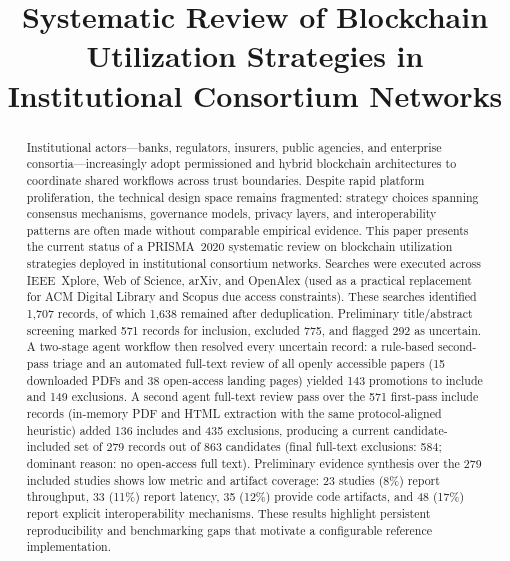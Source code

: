 \documentclass[journal]{IEEEtran}
\begin{document}
\title{Systematic Review of Blockchain Utilization Strategies in Institutional Consortium Networks}

\author{
}

\maketitle

\begin{abstract}
Institutional actors---banks, regulators, insurers, public agencies, and enterprise consortia---increasingly adopt permissioned and hybrid blockchain architectures to coordinate shared workflows across trust boundaries.
Despite rapid platform proliferation, the technical design space remains fragmented: strategy choices spanning consensus mechanisms, governance models, privacy layers, and interoperability patterns are often made without comparable empirical evidence.
This paper presents the current status of a PRISMA~2020 systematic review on blockchain utilization strategies deployed in institutional consortium networks.
Searches were executed across IEEE~Xplore, Web of Science, arXiv, and OpenAlex (used as a practical replacement for ACM Digital Library and Scopus due access constraints).
These searches identified 1,707 records, of which 1,638 remained after deduplication.
Preliminary title/abstract screening marked 571 records for inclusion, excluded 775, and flagged 292 as uncertain.
A two-stage agent workflow then resolved every uncertain record: a rule-based second-pass triage and an automated full-text review of all openly accessible papers (15 downloaded PDFs and 38 open-access landing pages) yielded 143 promotions to include and 149 exclusions.
A second agent full-text review pass over the 571 first-pass include records (in-memory PDF and HTML extraction with the same protocol-aligned heuristic) added 136 includes and 435 exclusions, producing a current candidate-included set of 279 records out of 863 candidates (final full-text exclusions: 584; dominant reason: no open-access full text).
Preliminary evidence synthesis over the 279 included studies shows low metric and artifact coverage: 23 studies (8\%) report throughput, 33 (11\%) report latency, 35 (12\%) provide code artifacts, and 48 (17\%) report explicit interoperability mechanisms.
These results highlight persistent reproducibility and benchmarking gaps that motivate a configurable reference implementation.
\end{abstract}
\end{document}
